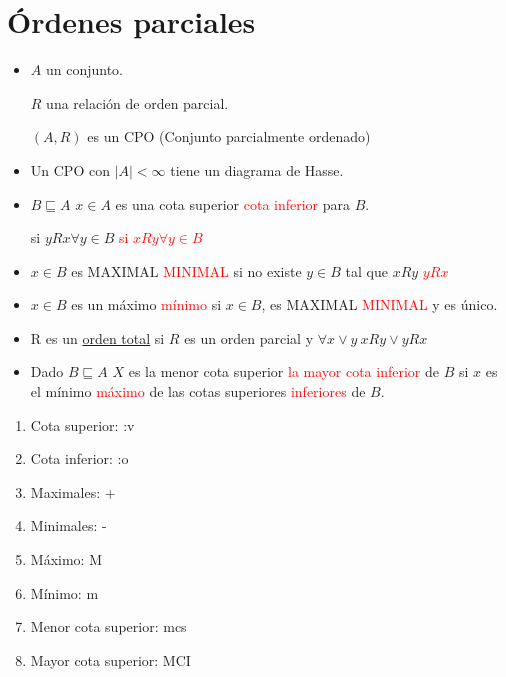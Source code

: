 \documentclass[12pt, twoside]{article}
\begin{document}
\setcounter{chapter}{4}
\chapter{Órdenes parciales}%
\thispagestyle{fancy}


\begin{itemize}
	\item $A$ un conjunto.

		$R$ una relación de orden parcial.

		$(A,R)$ es un CPO (Conjunto parcialmente ordenado)

	\item Un CPO con $|A| < \infty$ tiene un diagrama de Hasse.

	\item $B \sqsubseteq A$
		$x\in A$ es una cota superior \textcolor{red}{cota inferior} para $B$.

		si $yRx \forall y\in B$
		\textcolor{red}{si $xRy \forall y\in B$}

	\item $x\in B$ es MAXIMAL \textcolor{red}{MINIMAL} si no existe $y\in B$
		tal que $xRy$ \textcolor{red}{$yRx$}

	\item $x\in B$ es un máximo \textcolor{red}{mínimo} si $x\in B$, es MAXIMAL
		\textcolor{red}{MINIMAL} y es único.

	\item R es un \underline{orden total} si $R$ es un orden parcial y
		$\forall x \vee y\ xRy \vee yRx$

	\item Dado $B \sqsubseteq A$ $X$ es la menor cota superior
		\textcolor{red}{la mayor cota inferior} de $B$ si $x$
		es el mínimo \textcolor{red}{máximo} de las cotas superiores
		\textcolor{red}{inferiores } de $B$.
\end{itemize}
\begin{enumerate}
	\item Cota superior: :v
	\item Cota inferior: :o
	\item Maximales: +
	\item Minimales: -
	\item Máximo: M
	\item Mínimo: m
	\item Menor cota superior: mcs
	\item Mayor cota superior: MCI
\end{enumerate}
\end{document}
